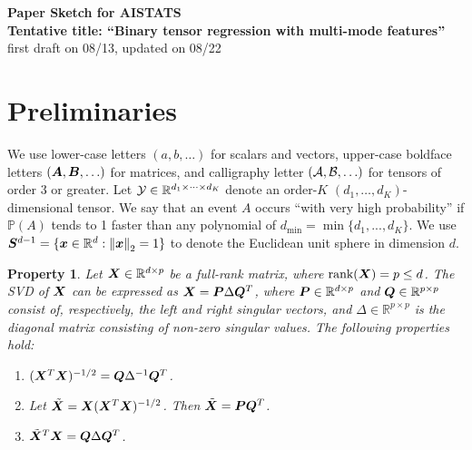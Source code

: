 \documentclass[11pt]{article}
\theoremstyle{plain}
\newtheorem{pro}{Property}
\theoremstyle{definition}
\begin{document}
\begin{center}
{\bf \large Paper Sketch for AISTATS\\
Tentative title: ``Binary tensor regression with multi-mode features''}\\
first draft on 08/13, updated on 08/22
\end{center}

\section{Preliminaries}


We use lower-case letters $(a, b, \ldots)$ for scalars and vectors, upper-case boldface letters $(\bm A, \bm B, \ldots)$ for matrices, and calligraphy letter $(\mathcal{A},\mathcal{B},\ldots)$ for tensors of order 3 or greater. Let $\mathcal{Y} \in \mathbb{R}^{d_1\times \cdots \times d_K}$ denote an order-$K$ $(d_1,\ldots,d_K)$-dimensional tensor. We say that an event $A$ occurs ``with very high probability'' if $\mathbb{P}(A)$ tends to 1 faster than any polynomial of $d_{\min}=\min\{d_1, . . . , d_K\}$. We use $\bm S^{d-1}=\{\bm x\in\mathbb{R}^d: \left\lVert\bm x\right\rVert_2=1\}$ to denote the Euclidean unit sphere in dimension $d$.\\


\begin{pro}\label{eq:defn}
Let $\bm X\in\mathbb{R}^{d\times p}$ be a full-rank matrix, where $\text{rank}(\bm X)=p\leq d$. The SVD of $\bm X$ can be expressed as $\bm X=\bm{P}\Delta\bm{Q}^T$, where $\bm{P}\in\mathbb{R}^{d\times p}$ and $\bm{Q}\in\mathbb{R}^{p\times p}$ consist of, respectively, the left and right singular vectors, and $\Delta\in\mathbb{R}^{p\times p}$ is the diagonal matrix consisting of non-zero singular values. The following properties hold:
\begin{enumerate}
\item $(\bm X^T\bm X)^{-1/2}=\bm{Q}\Delta^{-1}\bm{Q}^T$.
\item Let $\tilde {\bm X}=\bm X(\bm X^T\bm X)^{-1/2}$. Then $\tilde {\bm X}=\bm{P}\bm{Q}^{T}$.
\item $\tilde {\bm X}^T\bm X=\bm{Q}\Delta\bm{Q}^T$.
\end{enumerate}
\end{pro}
\end{document}
